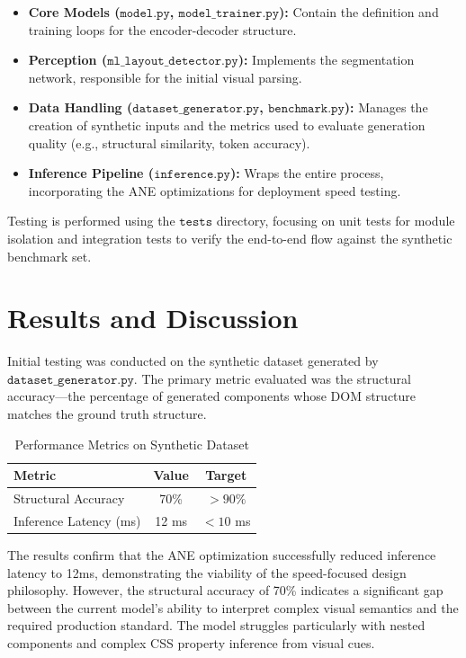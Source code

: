 \documentclass[11pt,a4paper]{article}
\begin{document}
\begin{itemize}
    \item \textbf{Core Models ($\texttt{model.py}$, $\texttt{model\_trainer.py}$):} Contain the definition and training loops for the encoder-decoder structure.
    \item \textbf{Perception ($\texttt{ml\_layout\_detector.py}$):} Implements the segmentation network, responsible for the initial visual parsing.
    \item \textbf{Data Handling ($\texttt{dataset\_generator.py}$, $\texttt{benchmark.py}$):} Manages the creation of synthetic inputs and the metrics used to evaluate generation quality (e.g., structural similarity, token accuracy).
    \item \textbf{Inference Pipeline ($\texttt{inference.py}$):} Wraps the entire process, incorporating the ANE optimizations for deployment speed testing.
\end{itemize}

Testing is performed using the $\texttt{tests}$ directory, focusing on unit tests for module isolation and integration tests to verify the end-to-end flow against the synthetic benchmark set.

\section{Results and Discussion}
Initial testing was conducted on the synthetic dataset generated by $\texttt{dataset\_generator.py}$. The primary metric evaluated was the structural accuracy—the percentage of generated components whose DOM structure matches the ground truth structure.

\begin{table}[H]
    \centering
    \caption{Performance Metrics on Synthetic Dataset}
    \label{tab:results}
    \begin{tabular}{lcc}
        \toprule
        Metric & Value & Target \\
        \midrule
        Structural Accuracy & 70\% & $>90\%$ \\
        Inference Latency (ms) & 12 ms & $<10$ ms \\
        \bottomrule
    \end{tabular}
\end{table}

The results confirm that the ANE optimization successfully reduced inference latency to 12ms, demonstrating the viability of the speed-focused design philosophy. However, the structural accuracy of 70\% indicates a significant gap between the current model's ability to interpret complex visual semantics and the required production standard. The model struggles particularly with nested components and complex CSS property inference from visual cues.
\end{document}
